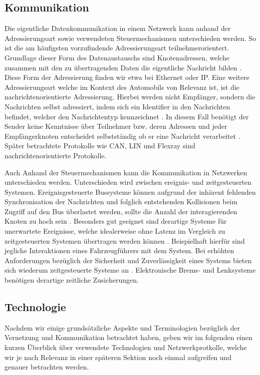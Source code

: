     \subsection{Kommunikation}
    Die eigentliche Datenkommunikation in einem Netzwerk kann anhand der Adressierungsart sowie verwendeten Steuermechanismen unterschieden werden. So ist
    die am häufigsten vorzufindende Adressierungsart teilnehmerorientert. Grundlage dieser Form des Datenaustauschs sind Knotenadressen, welche zusammen mit den
    zu übertragenden Daten die eigentliche Nachricht bilden \cite{reif2011bosch}. Diese Form der Adressierung finden wir etwa bei Ethernet oder IP. Eine weitere Adressierungsart 
    welche im Kontext des Automobils von Relevanz ist, ist die nachrichtenorientierte Adressierung. Hierbei werden nicht Empfänger, sondern die Nachrichten selbst
    adressiert, indem sich ein Identifier in den Nachrichten befindet, welcher den Nachrichtentyp kennzeichnet \cite{reif2011bosch}. In diesem Fall benötigt der Sender keine 
    Kenntnisse über Teilnehmer bzw. deren Adressen und jeder Empfängerknoten entscheidet selbstständig ob er eine Nachricht verarbeitet \cite{reif2011bosch}. Später betrachtete
    Protokolle wie CAN, LIN und Flexray sind nachrichtenorientierte Protokolle.

    Auch Anhand der Steuermechanismen kann die Kommunikation in Netzwerken unterschieden werden. Unterschieden wird zwischen ereignis- und zeitgesteuerten Systemen.
    Ereignisgesteuerte Bussysteme können aufgrund der inhärent fehlenden Synchronisation der Nachrichten und folglich entstehenden Kollisionen beim Zugriff auf den Bus
    überlastet werden, sollte die Anzahl der interagierenden Knoten zu hoch sein \cite{reif2011bosch}. Besonders gut geeignet sind derartige Systeme für unerwartete Ereignisse,
    welche idealerweise ohne Latenz im Vergleich zu zeitgesteuerten Systemen übertragen werden können \cite{reif2011bosch}. Beispielhaft hierfür sind jegliche Interaktionen eines 
    Fahrzeugführers mit dem System. Bei erhöhten Anforderungen bezüglich der Sicherheit und Zuverlässigkeit eines Systems bieten sich wiederum zeitgesteuerte Systeme an \cite{reif2011bosch}.
    Elektronische Brems- und Lenksysteme benötigen derartige zeitliche Zusicherungen.
    \subsection{Technologie}
    Nachdem wir einige grundsätzliche Aspekte und Terminologien bezüglich der Vernetzung und Kommunikation betrachtet haben, geben wir im folgenden einen kurzen Überblick
    über verwendete Technologien und Netzwerkprotkolle, welche wir je nach Relevanz in einer späteren Sektion noch einmal aufgreifen und genauer betrachten werden.

